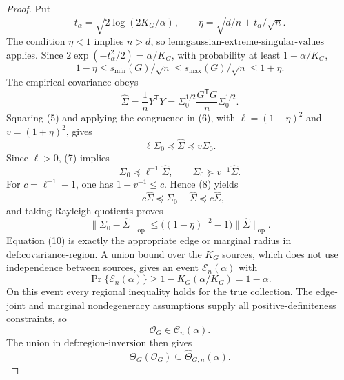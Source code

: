 \documentclass{article}
\begin{document}
\begin{proof}
Put
\[
t_\alpha=\sqrt{2\log(2K_G/\alpha)},
\qquad
\eta=\sqrt{d/n}+t_\alpha/\sqrt n.
\tag{4}
\]
The condition \(\eta<1\) implies \(n>d\), so \(\text{lem:gaussian-extreme-singular-values}\) applies.  Since \(2\exp(-t_\alpha^2/2)=\alpha/K_G\), with probability at least \(1-\alpha/K_G\),
\[
1-\eta\le s_{\min}(G)/\sqrt n
\le s_{\max}(G)/\sqrt n\le1+\eta.
\tag{5}
\]
The empirical covariance obeys
\[
\widehat\Sigma
=\frac1nY^{\mathsf T}Y
=\Sigma_0^{1/2}\frac{G^{\mathsf T}G}{n}\Sigma_0^{1/2}.
\tag{6}
\]
Squaring (5) and applying the congruence in (6), with \(\ell=(1-\eta)^2\) and \(v=(1+\eta)^2\), gives
\[
\ell\Sigma_0\preceq\widehat\Sigma\preceq v\Sigma_0.
\tag{7}
\]
Since \(\ell>0\), (7) implies
\[
\Sigma_0\preceq\ell^{-1}\widehat\Sigma,
\qquad
\Sigma_0\succeq v^{-1}\widehat\Sigma.
\tag{8}
\]
For \(c=\ell^{-1}-1\), one has \(1-v^{-1}\le c\).  Hence (8) yields
\[
-c\widehat\Sigma\preceq\Sigma_0-\widehat\Sigma
\preceq c\widehat\Sigma,
\tag{9}
\]
and taking Rayleigh quotients proves
\[
\|\Sigma_0-\widehat\Sigma\|_{\mathrm{op}}
\le\bigl((1-\eta)^{-2}-1\bigr)\|\widehat\Sigma\|_{\mathrm{op}}.
\tag{10}
\]
Equation (10) is exactly the appropriate edge or marginal radius in \(\text{def:covariance-region}\).  A union bound over the \(K_G\) sources, which does not use independence between sources, gives an event \(\mathcal E_n(\alpha)\) with
\[
\Pr\{\mathcal E_n(\alpha)\}\ge1-K_G(\alpha/K_G)=1-\alpha.
\tag{11}
\]
On this event every regional inequality holds for the true collection.  The edge-joint and marginal nondegeneracy assumptions supply all positive-definiteness constraints, so
\[
\mathcal O_G\in\mathcal C_n(\alpha).
\tag{12}
\]
The union in \(\text{def:region-inversion}\) then gives
\[
\Theta_G(\mathcal O_G)\subseteq\widehat\Theta_{G,n}(\alpha).
\tag{13}
\]


\end{proof}
\end{document}
